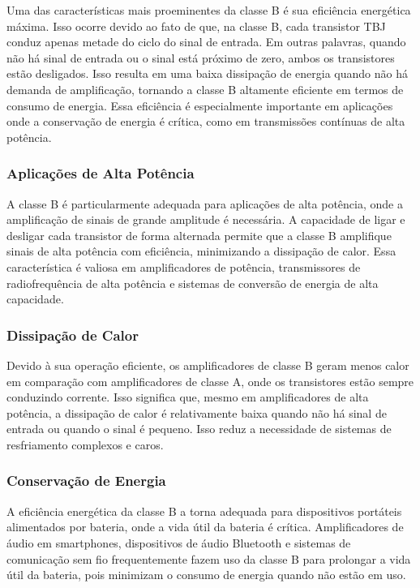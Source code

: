 Uma das características mais proeminentes da classe B é sua eficiência energética máxima. Isso ocorre devido ao fato de que, na classe B, cada transistor TBJ conduz apenas metade do ciclo do sinal de entrada. Em outras palavras, quando não há sinal de entrada ou o sinal está próximo de zero, ambos os transistores estão desligados. Isso resulta em uma baixa dissipação de energia quando não há demanda de amplificação, tornando a classe B altamente eficiente em termos de consumo de energia. Essa eficiência é especialmente importante em aplicações onde a conservação de energia é crítica, como em transmissões contínuas de alta potência.

\subsubsection{Aplicações de Alta Potência}

A classe B é particularmente adequada para aplicações de alta potência, onde a amplificação de sinais de grande amplitude é necessária. A capacidade de ligar e desligar cada transistor de forma alternada permite que a classe B amplifique sinais de alta potência com eficiência, minimizando a dissipação de calor. Essa característica é valiosa em amplificadores de potência, transmissores de radiofrequência de alta potência e sistemas de conversão de energia de alta capacidade.

\subsubsection{Dissipação de Calor}

Devido à sua operação eficiente, os amplificadores de classe B geram menos calor em comparação com amplificadores de classe A, onde os transistores estão sempre conduzindo corrente. Isso significa que, mesmo em amplificadores de alta potência, a dissipação de calor é relativamente baixa quando não há sinal de entrada ou quando o sinal é pequeno. Isso reduz a necessidade de sistemas de resfriamento complexos e caros.

\subsubsection{Conservação de Energia}

A eficiência energética da classe B a torna adequada para dispositivos portáteis alimentados por bateria, onde a vida útil da bateria é crítica. Amplificadores de áudio em smartphones, dispositivos de áudio Bluetooth e sistemas de comunicação sem fio frequentemente fazem uso da classe B para prolongar a vida útil da bateria, pois minimizam o consumo de energia quando não estão em uso.

